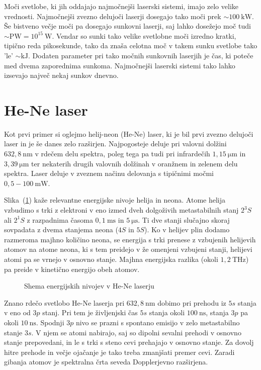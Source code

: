 Moči svetlobe, ki jih oddajajo najmočnejši laserski sistemi, imajo zelo velike
vrednosti. Najmočnejši zvezno delujoči laserji dosegajo tako moči prek 
$\sim 100~\si{\kilo\watt}$. Še bistveno večje moči pa dosegajo sunkovni laserji, 
saj lahko dosežejo moč tudi $\sim \si{\peta\watt} = 10^{15}~\si{\watt}$. 
Vendar so sunki tako velike svetlobne moči izredno kratki, tipično reda pikosekunde, tako da
znaša celotna moč v takem sunku svetlobe tako 'le' $\sim \si{\kilo\joule}$. Dodaten 
parameter pri tako močnih sunkovnih laserjih je čas, ki poteče med dvema zaporednima
sunkoma. Najmočnejši laserski sistemi tako lahko izsevajo največ nekaj sunkov dnevno. 

\section{He-Ne laser}

Kot prvi primer si oglejmo helij-neon (He-Ne) laser, ki je bil prvi zvezno 
delujoči laser in je še danes zelo razširjen. Najpogosteje deluje 
pri valovni dolžini $632,8~\si{\nano\metre}$ v rdečem delu spektra, poleg 
tega pa tudi pri infrardečih $1,15~\si{\micro\metre}$ in 
$3,39~\si{\micro\metre}$ ter nekaterih drugih
valovnih dolžinah v oranžnem in zelenem delu spektra. Laser deluje v zveznem 
načinu delovanja s tipičnimi močmi $0,5 - 100~\si{\milli\watt}$.

Slika~(\ref{fig:HeNeE}) kaže relevantne energijske nivoje helija in neona. Atome helija
vzbudimo s trki z elektroni v eno izmed dveh dolgoživih metastabilnih stanj $2^3S$ ali
$2^1S$ z razpadnima časoma $0,1~\si{\milli\second}$ in $5~\si{\micro\second}$.
Ti dve stanji slučajno skoraj sovpadata z dvema stanjema neona ($4S$ in $5S$). 
Ko v helijev plin dodamo razmeroma majhno količino neona, se energija s trki 
prenese z vzbujenih helijevih atomov na atome neona, ki s tem preidejo v 
že omenjeni vzbujeni stanji, helijevi atomi pa se vrnejo v osnovno stanje. 
Majhna energijska razlika (okoli $1,2~\si{\tera\hertz}$) pa preide v
kinetično energijo obeh atomov. 
\begin{figure}[h]
\centering
\def\svgwidth{100truemm} 

\caption{Shema energijskih nivojev v He-Ne laserju}
\label{fig:HeNeE}
\end{figure}

Znano rdečo svetlobo He-Ne laserja pri $632,8~\si{\nano\metre}$ dobimo 
pri prehodu iz $5s$ stanja v eno od $3p$ stanj. Pri tem je življenjski čas 
$5s$ stanja okoli $100~\si{\nano\second}$, stanja $3p$ pa okoli $10~\si{\nano\second}$.
Spodnji $3p$ nivo se prazni s spontano emisijo v zelo metastabilno stanje $3s$. 
V njem se atomi nabirajo, saj so dipolni sevalni prehodi v osnovno stanje prepovedani,
in le s trki s steno cevi prehajajo v osnovno stanje. Za dovolj hitre prehode in 
večje ojačanje je tako treba zmanjšati premer cevi. Zaradi gibanja atomov je 
spektralna črta seveda Dopplerjevno razširjena. 

